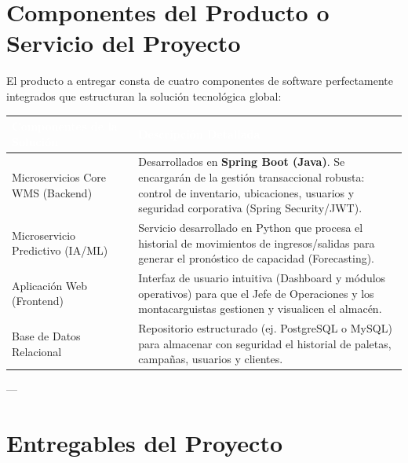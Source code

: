 \documentclass[11pt]{article}
\newcounter{none} %
\begin{document}
\section{Componentes del Producto o Servicio del Proyecto}

El producto a entregar consta de cuatro componentes de software perfectamente integrados que estructuran la solución tecnológica global:

\vspace{0.3cm}
\setlength{\tabcolsep}{6pt}
\renewcommand{\arraystretch}{1.5}
{\def\LTcaptype{none}
\begin{longtable}[]{@{}
  >{\raggedright\arraybackslash}p{0.32\linewidth}
  >{\raggedright\arraybackslash}p{0.68\linewidth}@{}}
\rowcolor{DeepNavy}
\textcolor{white}{\textbf{Componentes de la Solución}} & \textcolor{white}{\textbf{Descripción Detallada}} \\ \hline
\endhead
\rowcolor{LightGray}
Microservicios Core WMS (Backend) & Desarrollados en \textbf{Spring Boot (Java)}. Se encargarán de la gestión transaccional robusta: control de inventario, ubicaciones, usuarios y seguridad corporativa (Spring Security/JWT). \\ \hline
Microservicio Predictivo (IA/ML) & Servicio desarrollado en Python que procesa el historial de movimientos de ingresos/salidas para generar el pronóstico de capacidad (Forecasting). \\ \hline
\rowcolor{LightGray}
Aplicación Web (Frontend) & Interfaz de usuario intuitiva (Dashboard y módulos operativos) para que el Jefe de Operaciones y los montacarguistas gestionen y visualicen el almacén. \\ \hline
Base de Datos Relacional & Repositorio estructurado (ej. PostgreSQL o MySQL) para almacenar con seguridad el historial de paletas, campañas, usuarios y clientes. \\ \hline
\end{longtable}
}

---

\section{Entregables del Proyecto}
\end{document}
